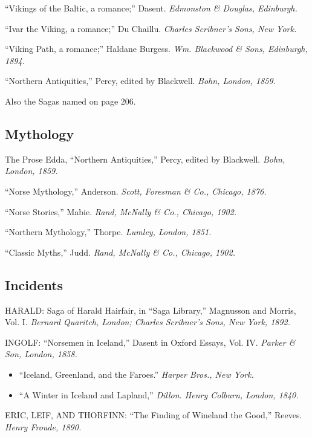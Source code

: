 \noindent ``Vikings of the Baltic, a romance;'' Dasent. \emph{Edmonston
\& Douglas, Edinburgh.}

\noindent ``Ivar the Viking, a romance;'' Du Chaillu. \emph{Charles
Scribner's Sons, New York.}

\noindent ``Viking Path, a romance;'' Haldane Burgess. \emph{Wm.
Blackwood \& Sons, Edinburgh, 1894.}

\noindent ``Northern Antiquities,'' Percy, edited by Blackwell.
\emph{Bohn, London, 1859.}

\noindent Also the Sagas named on page 206.

\subsection*{Mythology}

The Prose Edda, ``Northern Antiquities,'' Percy, edited by Blackwell.
\emph{Bohn, London, 1859.}

\noindent ``Norse Mythology,'' Anderson. \emph{Scott, Foresman \& Co.,
Chicago, 1876.}

\noindent ``Norse Stories,'' Mabie. \emph{Rand, McNally \& Co., Chicago,
1902.}

\noindent ``Northern Mythology,'' Thorpe. \emph{Lumley, London, 1851.}

\noindent ``Classic Myths,'' Judd. \emph{Rand, McNally \& Co., Chicago,
1902.}

\subsection*{Incidents}

HARALD: Saga of Harald Hairfair, in ``Saga Library,'' Magnusson and
Morris, Vol. I. \emph{Bernard Quaritch, London; Charles Scribner's Sons,
New York, 1892.}

\noindent INGOLF: ``Norsemen in Iceland,'' Dasent in Oxford Essays, Vol.
IV. \emph{Parker \& Son, London, 1858.}

\begin{itemize}[itemsep=0pt]
\item ``Iceland, Greenland, and the Faroes.'' \emph{Harper Bros., New York.}
\item ``A Winter in Iceland and Lapland,'' \emph{Dillon. Henry Colburn, London,
1840.}
\end{itemize}

\noindent ERIC, LEIF, AND THORFINN: ``The Finding of Wineland the Good,''
Reeves. \emph{Henry Froude, 1890.}

